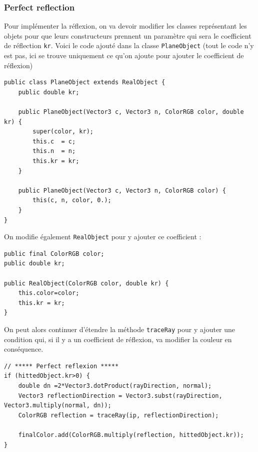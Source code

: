 \subsubsection{Perfect reflection}

Pour implémenter la réflexion, on va devoir modifier les classes représentant les objets pour que leurs constructeurs prennent un paramètre qui sera le coefficient de réflection \texttt{kr}. Voici le code ajouté dans la classe \texttt{PlaneObject} (tout le code n'y est pas, ici se trouve uniquement ce qu'on ajoute pour ajouter le coefficient de réflexion)

\begin{lstlisting}
public class PlaneObject extends RealObject {
    public double kr;
    
    public PlaneObject(Vector3 c, Vector3 n, ColorRGB color, double kr) {
        super(color, kr);
        this.c  = c;
        this.n  = n;
        this.kr = kr;
    }
    
    public PlaneObject(Vector3 c, Vector3 n, ColorRGB color) {
        this(c, n, color, 0.);
    }
}
\end{lstlisting}

On modifie également \texttt{RealObject} pour y ajouter ce coefficient :

\begin{lstlisting}
public final ColorRGB color;
public double kr;

public RealObject(ColorRGB color, double kr) {
    this.color=color;
    this.kr = kr;
}
\end{lstlisting}

On peut alors continuer d'étendre la méthode \texttt{traceRay} pour y ajouter une condition qui, si il y a un coefficient de réflexion, va modifier la couleur en conséquence.

\begin{lstlisting}
// ***** Perfect reflexion *****
if (hittedObject.kr>0) { 
    double dn =2*Vector3.dotProduct(rayDirection, normal);
    Vector3 reflectionDirection = Vector3.subst(rayDirection, Vector3.multiply(normal, dn));
    ColorRGB reflection = traceRay(ip, reflectionDirection);
    
    finalColor.add(ColorRGB.multiply(reflection, hittedObject.kr));
}
\end{lstlisting}

